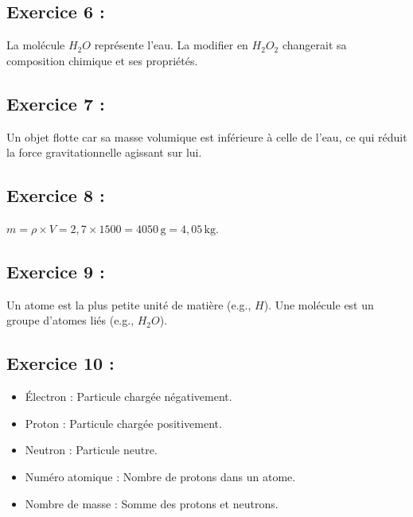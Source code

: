 \documentclass[a4paper,12pt]{article}
\begin{document}
\subsection*{Exercice 6 :}
La molécule \( H_2O \) représente l’eau. La modifier en \( H_2O_2 \) changerait sa composition chimique et ses propriétés.

\subsection*{Exercice 7 :}
Un objet flotte car sa masse volumique est inférieure à celle de l’eau, ce qui réduit la force gravitationnelle agissant sur lui.

\subsection*{Exercice 8 :}
\( m = \rho \times V = 2,7 \times 1500 = 4050 \, \text{g} = 4,05 \, \text{kg} \).

\subsection*{Exercice 9 :}
Un atome est la plus petite unité de matière (e.g., \( H \)). Une molécule est un groupe d’atomes liés (e.g., \( H_2O \)).

\subsection*{Exercice 10 :}
\begin{itemize}
    \item Électron : Particule chargée négativement.
    \item Proton : Particule chargée positivement.
    \item Neutron : Particule neutre.
    \item Numéro atomique : Nombre de protons dans un atome.
    \item Nombre de masse : Somme des protons et neutrons.
\end{itemize}
\end{document}
